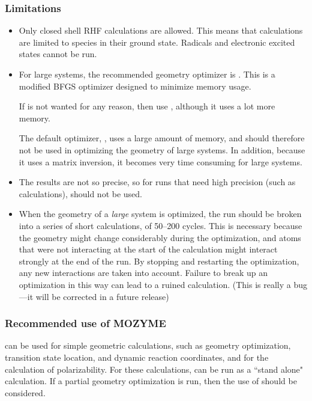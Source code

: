 \subsubsection{Limitations}
\begin{itemize}
\item Only closed shell RHF calculations are allowed.  This means that
 calculations are limited to species in their ground
state.  Radicals and electronic excited states cannot be run.
\item For large systems, the recommended geometry optimizer is
.  This is a modified BFGS optimizer designed to
minimize memory usage.

If  is not wanted for any reason, then use
, although it uses a lot more memory.

The default optimizer, , uses a large amount of memory,
and should therefore not be used in optimizing the geometry of
large systems.  In addition, because it uses a matrix inversion,
it becomes very time consuming for large systems.

\item The results are not so precise, so for
runs that need high precision (such as  calculations),
 should not be used.

\item When the geometry of a {\em large} system is optimized, the run should
be broken into a series of short calculations, of 50--200 cycles.  This is
necessary because the geometry might change considerably during the optimization,
 and atoms that were not interacting at the start of the calculation might interact
strongly at the end of the run.  By stopping and restarting the optimization,
any new interactions are taken into account.  Failure to break up an optimization
in this way can lead to a ruined calculation.
(This is really a bug---it will be corrected in a future release)
\end{itemize}
\subsubsection{Recommended use of MOZYME}
 can be used for simple geometric calculations, such as
geometry optimization, transition state
location, and dynamic reaction coordinates, and for the calculation
of polarizability.  For these calculations,  can be run
as a ``stand alone" calculation.  If a partial geometry optimization is run, then
the use of  should be considered.

